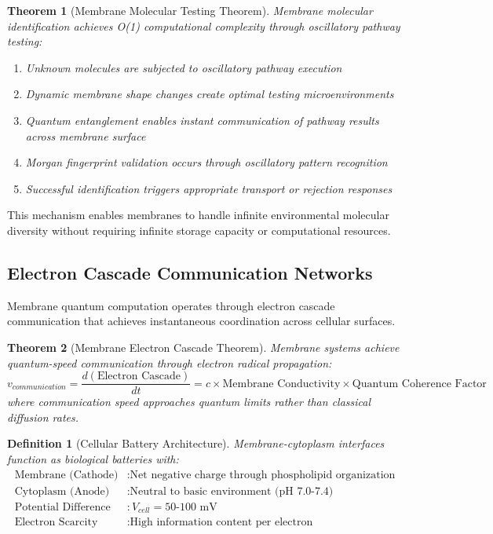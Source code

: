 \documentclass[12pt,a4paper]{article}
\newtheorem{theorem}{Theorem}
\newtheorem{definition}{Definition}
\begin{document}
\begin{theorem}[Membrane Molecular Testing Theorem]
Membrane molecular identification achieves O(1) computational complexity through oscillatory pathway testing:
\begin{enumerate}
\item Unknown molecules are subjected to oscillatory pathway execution
\item Dynamic membrane shape changes create optimal testing microenvironments
\item Quantum entanglement enables instant communication of pathway results across membrane surface
\item Morgan fingerprint validation occurs through oscillatory pattern recognition
\item Successful identification triggers appropriate transport or rejection responses
\end{enumerate}
\end{theorem}

This mechanism enables membranes to handle infinite environmental molecular diversity without requiring infinite storage capacity or computational resources.

\subsection{Electron Cascade Communication Networks}

Membrane quantum computation operates through electron cascade communication that achieves instantaneous coordination across cellular surfaces.

\begin{theorem}[Membrane Electron Cascade Theorem]
Membrane systems achieve quantum-speed communication through electron radical propagation:
\begin{equation}
v_{communication} = \frac{d(\text{Electron Cascade})}{dt} = c \times \text{Membrane Conductivity} \times \text{Quantum Coherence Factor}
\end{equation}
where communication speed approaches quantum limits rather than classical diffusion rates.
\end{theorem}

\begin{definition}[Cellular Battery Architecture]
Membrane-cytoplasm interfaces function as biological batteries with:
\begin{align}
\text{Membrane (Cathode)} &: \text{Net negative charge through phospholipid organization} \\
\text{Cytoplasm (Anode)} &: \text{Neutral to basic environment (pH 7.0-7.4)} \\
\text{Potential Difference} &: V_{cell} = 50\text{-}100 \text{ mV} \\
\text{Electron Scarcity} &: \text{High information content per electron}
\end{align}
\end{definition}
\end{document}
